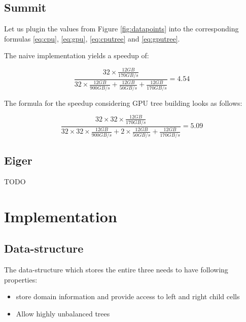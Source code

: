\documentclass[]{article}
\begin{document}
\subsection{Summit}

Let us plugin the values from Figure \ref{fig:datapoints} into the corresponding formulas \ref{eq:cpu}, \ref{eq:gpu}, \ref{eq:cputree} and \ref{eq:gputree}.

The naive implementation yields a speedup of:

\begin{center}
	\begin{equation}
		\frac{32 \times \frac{ 12 GB }{170 GB/s}}
		{32 \times \frac{12 GB}{900 GB/s} + \frac{12 GB}{50 GB/s}  + \frac{12 GB}{170 GB/s}}
		= 4.54
	\end{equation}
\end{center}

The formula for the speedup considering GPU tree building looks as follows:
\begin{center}
	\begin{equation}
		\frac{32 \times 32 \times \frac{ 12 GB }{170 GB/s}}
		{32 \times 32 \times \frac{12 GB}{900 GB/s} + 2 \times \frac{12 GB}{50 GB/s}  + \frac{12 GB}{170 GB/s}}
		= 5.09
	\end{equation}
\end{center}

\subsection{Eiger}

TODO 

\section{Implementation}

\subsection{Data-structure}

The data-structure which stores the entire three needs to have following properties:

\begin{itemize}
	\item store domain information and provide access to left and right child cells
	\item Allow highly unbalanced trees
\end{itemize}
\end{document}
